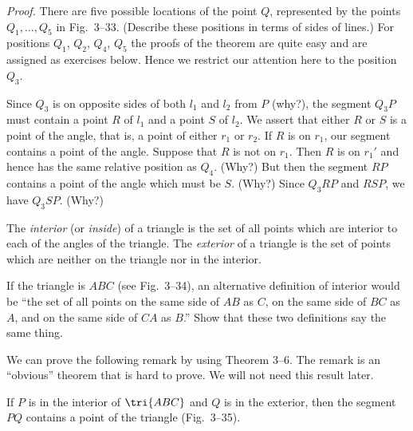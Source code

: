 \documentclass[11pt]{book}
\theoremstyle{bkplain}
\theoremstyle{XIplainnote}
\theoremstyle{bkplain}
\theoremstyle{bkplain}
\begin{document}
\noindent\emph{Proof.} There are five possible locations of the point $Q$,
represented by the points $Q_1, \ldots, Q_5$ in Fig.~3--33. (Describe these
positions in terms of sides of lines.) For positions $Q_1$, $Q_2$, $Q_4$, $Q_5$
the proofs of the theorem are quite easy and are assigned as exercises below.
Hence we restrict our attention here to the position $Q_3$.

\FIGIIITHIRTYTHREE

Since $Q_3$ is on opposite sides of both $l_1$ and $l_2$ from $P$ (why?), the
segment $Q_3P$ must contain a point $R$ of $l_1$ and a point $S$ of $l_2$. We
assert that either $R$ or $S$ is a point of the angle, that is, a point of either
$r_1$ or $r_2$. If $R$ is on $r_1$, our segment contains a point of the angle.
Suppose that $R$ is not on $r_1$. Then $R$ is on $r_1'$ and hence has the same
relative position as $Q_4$. (Why?) But then the segment $RP$ contains a point of
the angle which must be $S$. (Why?) Since $Q_3RP$ and $RSP$, we have $Q_3SP$.
(Why?)

\begin{definition}
The \emph{interior} (or \emph{inside}) of a triangle is the set of all points
which are interior to each of the angles of the triangle. The \emph{exterior} of
a triangle is the set of points which are neither on the triangle nor in the
interior.
\end{definition}

If the triangle is $ABC$ (see Fig.~3--34), an alternative definition of interior
would be ``the set of all points on the same side of $AB$ as $C$, on the same
side of $BC$ as $A$, and on the same side of $CA$ as $B$.'' Show that these two
definitions say the same thing.

We can prove the following remark by using Theorem 3--6. The remark is an
``obvious'' theorem that is hard to prove. We will not need this result later.

\begin{remark}
If $P$ is in the interior of $\tri{ABC}$ and $Q$ is in the exterior, then the
segment $PQ$ contains a point of the triangle (Fig.~3--35).
\end{remark}

\FIGIIITHIRTYFOURTHIRTYFIVE
\end{document}
